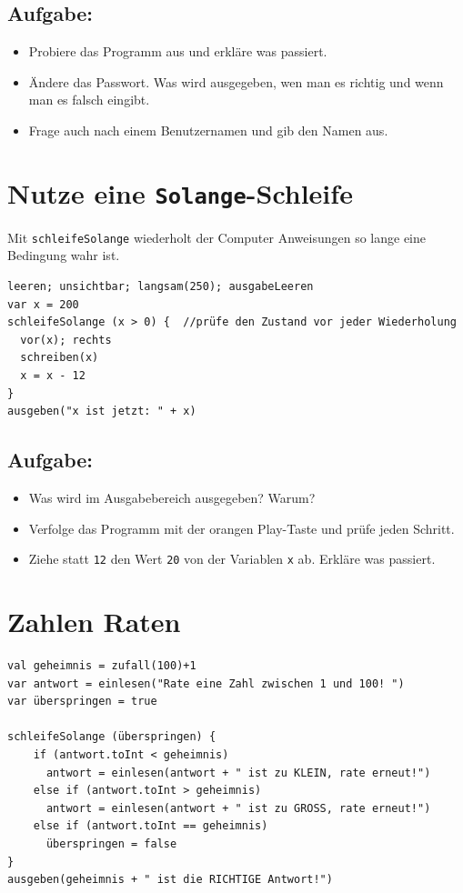 \section*{\color{BrickRed}Aufgabe:}


\begin{itemize}

\item {Probiere das Programm aus und erkläre was passiert.}
\item {Ändere das Passwort. Was wird ausgegeben, wen man es richtig und wenn man es falsch eingibt.}
\item {Frage auch nach einem Benutzernamen und gib den Namen aus.}

\end{itemize}


\chapter{Nutze eine \lstinline{Solange}-Schleife}Mit \lstinline{schleifeSolange} wiederholt der Computer Anweisungen so lange eine Bedingung wahr ist.

\begin{lstlisting}[basicstyle={\ttfamily\fontsize{22}{27}\selectfont},numbers=none]
leeren; unsichtbar; langsam(250); ausgabeLeeren
var x = 200
schleifeSolange (x > 0) {  //prüfe den Zustand vor jeder Wiederholung 
  vor(x); rechts
  schreiben(x) 
  x = x - 12
}
ausgeben("x ist jetzt: " + x)
\end{lstlisting}
        
\section*{\color{BrickRed}Aufgabe:}


\begin{itemize}

\item {Was wird im Ausgabebereich ausgegeben? Warum?}
\item {Verfolge das Programm mit der orangen Play-Taste und prüfe jeden Schritt.}
\item {Ziehe statt \lstinline{12} den Wert \lstinline{20} von der Variablen \lstinline{x} ab. Erkläre was passiert.}

\end{itemize}


\chapter{Zahlen Raten}
\begin{lstlisting}[basicstyle={\ttfamily\fontsize{16}{19}\selectfont},numbers=none]
val geheimnis = zufall(100)+1
var antwort = einlesen("Rate eine Zahl zwischen 1 und 100! ")
var überspringen = true

schleifeSolange (überspringen) {
    if (antwort.toInt < geheimnis)
      antwort = einlesen(antwort + " ist zu KLEIN, rate erneut!")
    else if (antwort.toInt > geheimnis)
      antwort = einlesen(antwort + " ist zu GROSS, rate erneut!")
    else if (antwort.toInt == geheimnis)
      überspringen = false
}
ausgeben(geheimnis + " ist die RICHTIGE Antwort!")
\end{lstlisting}
        
